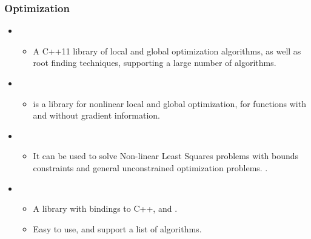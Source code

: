 \documentclass[letterpaper,10pt,english]{sphinxmanual}
\begin{document}
\subsubsection{Optimization}
\label{\detokenize{resource/programing/cpp_basic:optimization}}\begin{itemize}
\item {} 
\begin{itemize}
\item {} 
A C++11 library of local and global optimization algorithms, as
well as root finding techniques, supporting a large number of
algorithms.

\end{itemize}

\item {} 
\begin{itemize}
\item {} 
 is a library for nonlinear local and global
optimization, for functions with and without gradient information.

\end{itemize}

\item {} 
\begin{itemize}
\item {} 
It can be used to solve Non-linear Least Squares problems with
bounds constraints and general unconstrained optimization
problems. .

\end{itemize}

\item {} 
\begin{itemize}
\item {} 
A  library with bindings to C++,  and
.

\item {} 
Easy to use, and support a list of algorithms.

\end{itemize}

\end{itemize}
\end{document}
